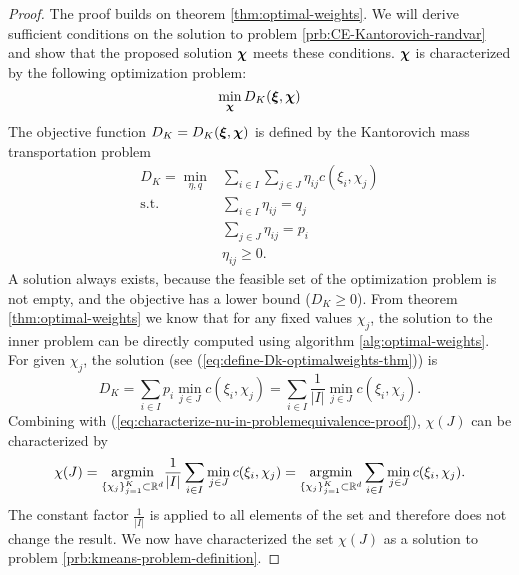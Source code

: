 \begin{proof}
  The proof builds on theorem \ref{thm:optimal-weights}.
  We will derive sufficient conditions on the solution to problem \ref{prb:CE-Kantorovich-randvar} and show that the proposed solution $\boldsymbol\chi$ meets these conditions.
  $\boldsymbol\chi$ is characterized by the following optimization problem:
  \begin{equation}
    \label{eq:characterize-nu-in-problemequivalence-proof}
    \min\limits_{\boldsymbol\chi}D_K(\boldsymbol\xi,\boldsymbol\chi)
  \end{equation}
  The objective function $D_K = D_K(\boldsymbol\xi,\boldsymbol\chi)$ is defined by the Kantorovich mass transportation problem
  \begin{subequations}
  \begin{align}
    \label{eq:kantoro-in-problemequivalence-proof}
    D_K = \min\limits_{\eta, q}& \sum_{i\in I}\sum_{j\in J}\eta_{ij}c(\xi_i,\chi_j)\\
    \text{s.t.}&\sum_{i\in I}\eta_{ij} = q_j\\
    &\sum_{j\in J}\eta_{ij} = p_i\\
    &\eta_{ij}\geq 0.
  \end{align}
  \end{subequations}
  A solution always exists, because the feasible set of the optimization problem is not empty, and the objective has a lower bound ($D_K\geq 0$).
  From theorem \ref{thm:optimal-weights} we know that for any fixed values $\chi_j$, the solution to the inner problem can be directly computed using algorithm \ref{alg:optimal-weights}.
  For given $\chi_j$, the solution (see (\ref{eq:define-Dk-optimalweights-thm})) is
  \begin{equation}
    \label{eq:repeat-Dk-optimalweights-for-kmeansproof}
    D_K = \sum_{i\in I}p_i\min\limits_{j\in J}c(\xi_i,\chi_j) = \sum_{i\in I}\frac{1}{|I|}\min\limits_{j\in J}c(\xi_i,\chi_j).
  \end{equation}
  Combining with (\ref{eq:characterize-nu-in-problemequivalence-proof}), $\chi(J)$ can be characterized by
  \begin{equation}
    \label{eq:end-of-kmeans-proof}
    \chi(J) = \underset{\{\chi_j\}_{j=1}^K\subset\mathbb{R}^d}{\operatorname{argmin}} \frac{1}{|I|}\sum_{i\in I}\min\limits_{j\in J} c(\xi_i,\chi_j) = \underset{\{\chi_j\}_{j=1}^K\subset\mathbb{R}^d}{\operatorname{argmin}} \sum_{i\in I}\min\limits_{j\in J} c(\xi_i,\chi_j).
  \end{equation}
  The constant factor $\frac{1}{|I|}$ is applied to all elements of the set and therefore does not change the result.
  We now have characterized the set $\chi(J)$ as a solution to problem \ref{prb:kmeans-problem-definition}.
\end{proof}
